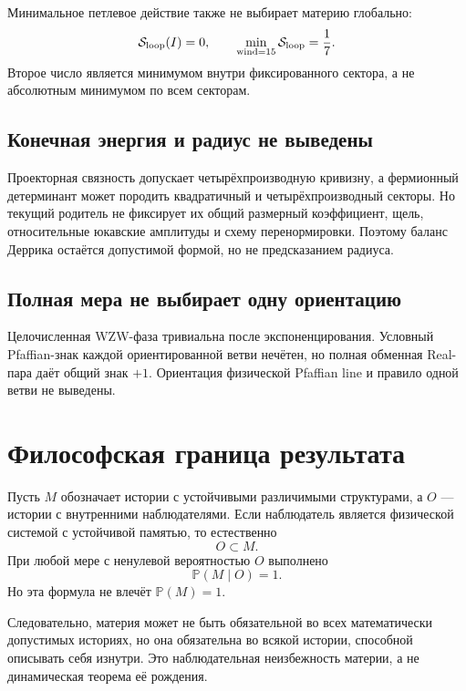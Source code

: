 Минимальное петлевое действие также не выбирает материю глобально:
\begin{equation}
 \mathcal S_{\rm loop}(I)=0,
 \qquad
 \min_{\operatorname{wind}=15}\mathcal S_{\rm loop}=\frac17.
 \label{eq:v5-final-zero-vs-matter-action}
\end{equation}
Второе число является минимумом внутри фиксированного сектора, а не
абсолютным минимумом по всем секторам.

\subsection{Конечная энергия и радиус не выведены}

Проекторная связность допускает четырёхпроизводную кривизну, а
фермионный детерминант может породить квадратичный и четырёхпроизводный
секторы. Но текущий родитель не фиксирует их общий размерный коэффициент,
щель, относительные юкавские амплитуды и схему перенормировки. Поэтому
баланс Деррика остаётся допустимой формой, но не предсказанием радиуса.

\subsection{Полная мера не выбирает одну ориентацию}

Целочисленная WZW-фаза тривиальна после экспоненцирования. Условный
Pfaffian-знак каждой ориентированной ветви нечётен, но полная обменная
Real-пара даёт общий знак $+1$. Ориентация физической Pfaffian line и
правило одной ветви не выведены.

\section{Философская граница результата}

Пусть $M$ обозначает истории с устойчивыми различимыми структурами, а
$O$ --- истории с внутренними наблюдателями. Если наблюдатель является
физической системой с устойчивой памятью, то естественно
\begin{equation}
 O\subset M.
\end{equation}
При любой мере с ненулевой вероятностью $O$ выполнено
\begin{equation}
 \mathbb P(M\mid O)=1.
 \label{eq:v5-final-observer-conditioning}
\end{equation}
Но эта формула не влечёт $\mathbb P(M)=1$.

Следовательно, материя может не быть обязательной во всех математически
допустимых историях, но она обязательна во всякой истории, способной
описывать себя изнутри. Это наблюдательная неизбежность материи, а не
динамическая теорема её рождения.

